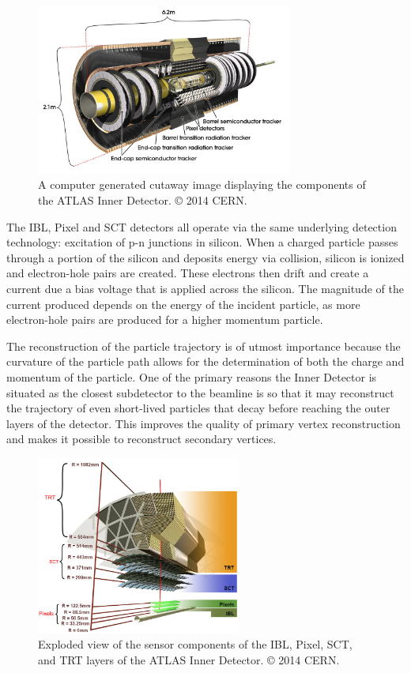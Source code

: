 \begin{figure}
	\centering
	\includegraphics[width=0.75\textwidth]{inner_detector}
	\caption{A computer generated cutaway image displaying the components of the ATLAS Inner Detector. © 2014 CERN.}
	\label{fig:inner_detector_cgi}
\end{figure}

The IBL, Pixel and SCT detectors all operate via the same underlying detection technology: excitation of p-n junctions in silicon.
When a charged particle passes through a portion of the silicon and deposits energy via collision, silicon is ionized and electron-hole pairs are created.
These electrons then drift and create a current due a bias voltage that is applied across the silicon.
The magnitude of the current produced depends on the energy of the incident particle, as more electron-hole pairs are produced for a higher momentum particle.

The reconstruction of the particle trajectory is of utmost importance because the curvature of the particle path allows for the determination of both the charge and momentum of the particle.
One of the primary reasons the Inner Detector is situated as the closest subdetector to the beamline is so that it may reconstruct the trajectory of even short-lived particles that decay before reaching the outer layers of the detector.
This improves the quality of primary vertex reconstruction and makes it possible to reconstruct secondary vertices. 

\begin{figure}
	\centering
	\includegraphics[width=0.6\textwidth]{inner_detector_zoomed}
	\caption{Exploded view of the sensor components of the IBL, Pixel, SCT, and TRT layers of the ATLAS Inner Detector. © 2014 CERN.}
	\label{fig:inner_detector_zoomed_cgi}
\end{figure}

